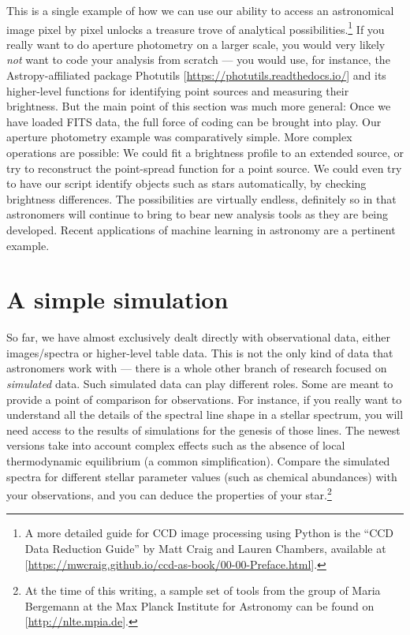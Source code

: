 \documentclass[twocolumn,apj]{openjournal}
\begin{document}
This is a single example of how we can use our ability to access an astronomical image pixel by pixel unlocks a treasure trove of analytical possibilities.\footnote{A more detailed guide for CCD image processing using Python is the ``CCD Data Reduction Guide'' by Matt Craig and Lauren Chambers, available at [\href{https://mwcraig.github.io/ccd-as-book/00-00-Preface.html}{https://mwcraig.github.io/ccd-as-book/00-00-Preface.html}].} If you really want to do aperture photometry on a larger scale, you would very likely {\em not} want to code your analysis from scratch --- you would use, for instance, the Astropy-affiliated package Photutils [\href{https://photutils.readthedocs.io/}{https://photutils.readthedocs.io/}] and its higher-level functions for identifying point sources and measuring their brightness. But the main point of this section was much more general: Once we have loaded FITS data, the full force of coding can be brought into play. Our aperture photometry example was comparatively simple. More complex operations are possible: We could fit a brightness profile to an extended source, or try to reconstruct the point-spread function for a point source. We could even try to have our script identify objects such as stars automatically, by checking brightness differences. The possibilities are virtually endless, definitely so in that astronomers will continue to bring to bear new analysis tools as they are being developed. Recent applications of machine learning in astronomy are a pertinent example.

\section{A simple simulation}
\label{Simulation}

So far, we have almost exclusively dealt directly with observational data, either images/spectra or higher-level table data. This is not the only kind of data that astronomers work with --- there is a whole other branch of research focused on {\em simulated} data. Such simulated data can play different roles. Some are meant to provide a point of comparison for observations. For instance, if you really want to understand all the details of the spectral line shape in a stellar spectrum, you will need access to the results of simulations for the genesis of those lines. The newest versions take into account complex effects such as the absence of local thermodynamic equilibrium (a common simplification). Compare the simulated spectra for different stellar parameter values (such as chemical abundances) with your observations, and you can deduce the properties of your star.\footnote{At the time of this writing, a sample set of tools from the group of Maria Bergemann at the Max Planck Institute for Astronomy can be found on [\href{http://nlte.mpia.de/}{http://nlte.mpia.de}].}
\end{document}

